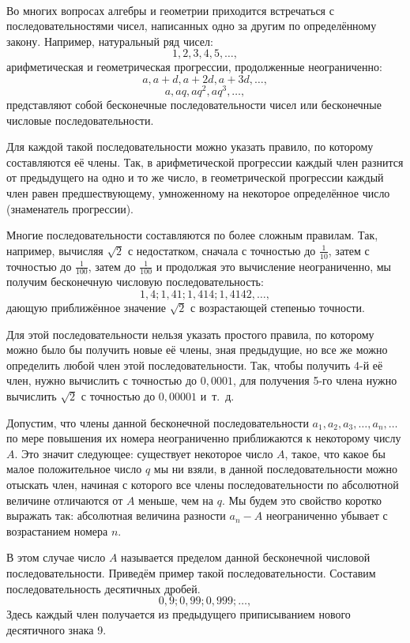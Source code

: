 \documentclass[oneside]{book}
\begin{document}
\paragraph{}\label{1938/227}
Во многих вопросах алгебры и геометрии приходится встречаться с последовательностями чисел, написанных одно за другим по определённому закону.
Например, натуральный ряд чисел:
\[1, 2, 3, 4, 5,\dots,\]
арифметическая и геометрическая прогрессии, продолженные неограниченно:
\[a,a+d,a+2d,a+3d,\dots,\]
\[a,aq,aq^2,aq^3,\dots,\]
представляют собой бесконечные последовательности чисел или бесконечные числовые последовательности.

Для каждой такой последовательности можно указать правило, по которому составляются её члены.
Так, в арифметической прогрессии каждый член разнится от предыдущего на одно и то же число, в геометрической прогрессии каждый член равен предшествующему, умноженному на некоторое определённое число (знаменатель прогрессии).

Многие последовательности составляются по более сложным правилам.
Так, например, вычисляя $\sqrt{2}$ с недостатком, сначала с точностью до $\tfrac1{10}$, затем с точностью до $\tfrac1{100}$, затем до $\tfrac1{100}$ и продолжая это вычисление неограниченно, мы получим бесконечную числовую последовательность:
\[1{,}4;
1{,}41;
1{,}414;
1{,}4142,\dots,\]
дающую приближённое значение  $\sqrt{2}$  с возрастающей степенью точности.

Для этой последовательности нельзя указать простого правила, по которому можно было бы получить новые её члены, зная предыдущие, но все же можно определить любой член этой последовательности.
Так, чтобы получить 4-й её член, нужно вычислить с точностью до $0{,}0001$, для получения 5-го члена нужно вычислить  $\sqrt{2}$  с точностью до $0{,}00001$ и~т.~д.

Допустим, что члены данной бесконечной последовательности $a_1, a_2, a_3, \dots, a_n,\dots$ по мере повышения их номера неограниченно приближаются к некоторому числу $A$.
Это значит следующее:
существует некоторое число $A$, такое, что какое бы малое положительное число $q$ мы ни взяли, в данной последовательности можно отыскать член, начиная с которого все члены последовательности по абсолютной величине отличаются от $A$ меньше, чем на $q$.
Мы будем это свойство коротко выражать так:
абсолютная величина разности $a_n-A$ %
неограниченно убывает с возрастанием номера $n$.

В этом случае число $A$ называется пределом данной бесконечной числовой последовательности.
Приведём пример такой последовательности.
Составим последовательность десятичных дробей.
\[0{,}9;
0{,}99;
0{,}999;\dots,\]
Здесь каждый член получается из предыдущего приписыванием нового десятичного знака 9.
\end{document}
